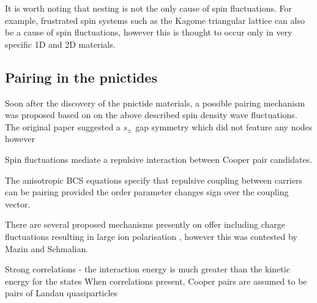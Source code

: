 It is worth noting that nesting is not the only cause of spin fluctuations. For example, frustrated spin systems such as the Kagome triangular lattice can also be a cause of spin fluctuations, however this is thought to occur only in very specific 1D and 2D materials.


\subsection{Pairing in the pnictides}

Soon after the discovery of the pnictide materials, a possible pairing mechanism was proposed based on on the above described spin density wave fluctuations. The original paper suggested a $s_{\pm}$ gap symmetry which did not feature any nodes however 

Spin fluctuations mediate a repulsive interaction between Cooper pair candidates.

The anisotropic \ac{BCS} equations specify that repulsive coupling between carriers can be pairing provided the order parameter changes sign over the coupling vector.

There are several proposed mechanisms presently on offer including charge fluctuations resulting in large ion polarisation \cite{Berciu2009}, however this was contested by Mazin and Schmalian\cite{Mazin2009}.


Strong correlations - the interaction energy is much greater than the kinetic energy for the states
When correlations present, Cooper pairs are assumed to be pairs of Landau quasiparticles



